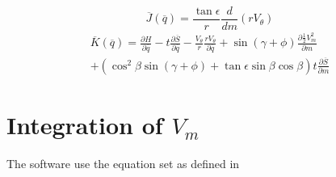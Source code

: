 \documentclass{report}
\begin{document}
        \begin{equation}
            \overline{J} \left(\overline{q}\right) = \frac{\tan \epsilon}{r} \frac{d}{dm}\left(rV_{\theta}\right)
        \end{equation}
        \begin{equation}
            \begin{multlined}
                \overline{K} \left(\overline{q}\right) = \frac{\partial H}{\partial \overline{q}} - t \frac{\partial \overline{S}}{\partial \overline{q}} - \frac{V_{\theta}}{r} \frac{rV_{\theta}}{\partial \overline{q}} + 
                \sin \left(\gamma + \phi\right) \frac{\partial \frac{1}{2}V_m^2}{\partial m} \\
                + \left(\cos^2 \beta \sin \left(\gamma + \phi \right) +  \tan \epsilon \sin \beta \cos \beta \right) t \frac{\partial \overline{S}}{\partial m}
            \end{multlined}
        \end{equation}
    \chapter{Integration of \(V_m\)}
    
    The software use the equation set as defined in \cite{Novak77}
    
    
\end{document}
